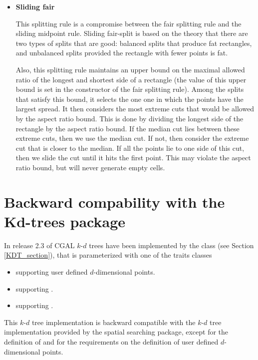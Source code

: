 \begin{itemize}
\item {\bf Sliding fair}

This splitting rule is a compromise between the fair splitting rule
and the sliding midpoint rule.
Sliding fair-split is based on the theory that there are
two types of splits that are good: balanced splits that
produce fat rectangles, and unbalanced splits provided
the rectangle with fewer points is fat.

Also, this splitting rule maintains an upper
bound on the maximal allowed ratio of the longest and shortest side of
a rectangle (the value of this upper bound is set in the constructor of the
fair splitting rule). Among the splits that satisfy this bound, it selects
the one one in which the points have the largest spread.
It then considers the most extreme cuts that would be allowed by the
aspect ratio bound. This is done by dividing the longest side of
the rectangle by the aspect ratio bound. If the median cut lies
between these extreme cuts, then we use the median cut. If not,
then consider the extreme cut that is closer to the median.
If all the points lie to one side of this cut, then we slide the cut
until it hits the first point.
This may violate the aspect ratio bound, but will never generate empty cells.

\end{itemize}

\section{Backward compability with the Kd-trees package}
\label{Spatial_searching:Backward_compability_Kd-trees}

In release 2.3 of CGAL
$k$-$d$ trees have been implemented by the class  (see Section \ref{KDT_section}), 
that is parameterized with one of the
traits classes 

\begin{itemize}

\item
{} supporting user defined $d$-dimensional points.

\item 
{} supporting . 

\item
{} supporting . 

\end{itemize}

This $k$-$d$ tree implementation is backward compatible with the 
$k$-$d$ tree implementation provided by the spatial searching package,
except for the definition of  
and for the requirements on the definition of user defined $d$-dimensional points.

